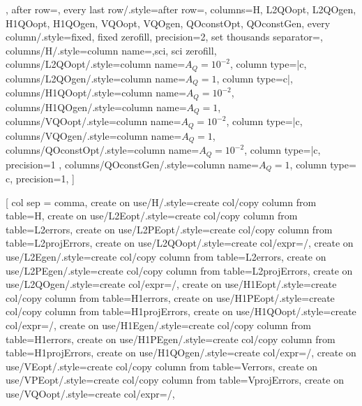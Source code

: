 \documentclass[a4paper]{article}
\theoremstyle{plain}
\theoremstyle{definition}
\begin{document}
\begin{table}[htb]
\begin{subtable}{\linewidth}
{{\hline
}, after row=\hline},
every last row/.style={after row=\bottomrule},
columns={H, L2QOopt, L2QOgen, H1QOopt, H1QOgen, VQOopt, VQOgen, QOconstOpt, QOconstGen},
every column/.style={fixed, fixed zerofill, precision=2, set thousands separator={}},
columns/H/.style={column name={},sci, sci zerofill},
columns/L2QOopt/.style={column name={\small$A_Q=10^{-2}$}, column type=|c},
columns/L2QOgen/.style={column name={\small$A_Q=1$}, column type=c|},
columns/H1QOopt/.style={column name={\small$A_Q=10^{-2}$}},
columns/H1QOgen/.style={column name={\small$A_Q=1$}},
columns/VQOopt/.style={column name={\small$A_Q=10^{-2}$}, column type=|c},
columns/VQOgen/.style={column name={\small$A_Q=1$}},
columns/QOconstOpt/.style={column name={\small$A_Q=10^{-2}$}, column type=|c, precision=1 },
columns/QOconstGen/.style={column name={\small$A_Q=1$}, column type= c, precision=1},
]{\ALLdata}
\caption{Problem~1}
\end{subtable}
\begin{subtable}{\linewidth}
\centering
{}
\pgfplotstablenew[
col sep = comma,
create on use/H/.style={create col/copy column from table={\OPTdata}{H}},
create on use/L2Eopt/.style={create col/copy column from table={\OPTdata}{L2errors}},
create on use/L2PEopt/.style={create col/copy column from table={\OPTdata}{L2projErrors}},
create on use/L2QOopt/.style={create col/expr={/}},
create on use/L2Egen/.style={create col/copy column from table={\GENdata}{L2errors}},
create on use/L2PEgen/.style={create col/copy column from table={\GENdata}{L2projErrors}},
create on use/L2QOgen/.style={create col/expr={/}},
create on use/H1Eopt/.style={create col/copy column from table={\OPTdata}{H1errors}},
create on use/H1PEopt/.style={create col/copy column from table={\OPTdata}{H1projErrors}},
create on use/H1QOopt/.style={create col/expr={/}},
create on use/H1Egen/.style={create col/copy column from table={\GENdata}{H1errors}},
create on use/H1PEgen/.style={create col/copy column from table={\GENdata}{H1projErrors}},
create on use/H1QOgen/.style={create col/expr={/}},
create on use/VEopt/.style={create col/copy column from table={\OPTdata}{Verrors}},
create on use/VPEopt/.style={create col/copy column from table={\OPTdata}{VprojErrors}},
create on use/VQOopt/.style={create col/expr={/}},

\end{subtable}
\end{table}
\end{document}
